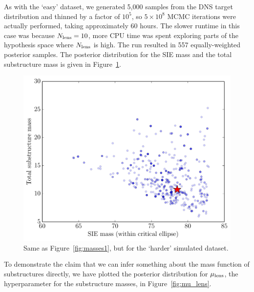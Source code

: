 \documentclass[useAMS,usenatbib]{mn2e}
\newcommand{\revisions}{\color{blue}}
\begin{document}
{\revisions As with the `easy' dataset,
we generated 5,000 samples from the DNS target distribution and thinned
by a factor of $10^5$, so $5 \times 10^8$ MCMC iterations were actually
performed, taking approximately 60 hours. The slower runtime in this case
was because $N_{\rm lens} = 10$, more CPU time was spent exploring parts of
the hypothesis space where $N_{\rm lens}$ is high. The run resulted in 557
equally-weighted posterior samples. The posterior distribution for the SIE
mass and the total substructure mass is given in Figure~\ref{fig:masses2}.
}

\begin{figure}
\begin{center}
\includegraphics[scale=0.4]{masses2.pdf}
\caption{{\revisions
Same as Figure~\ref{fig:masses1}, but for the `harder' simulated dataset.
}
\label{fig:masses2}}
\end{center}
\end{figure}

{\revisions
To demonstrate the claim that we can infer something about the mass function
of substructures directly, we have plotted the posterior
distribution for $\mu_{\rm lens}$, the hyperparameter for the substructure
masses, in Figure~\ref{fig:mu_lens}.
}
\end{document}
